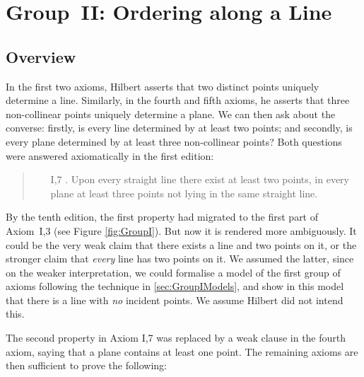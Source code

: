 \chapter{Group~II: Ordering along a Line}\label{chapter:LinearOrder}
\section{Overview}
In the first two axioms, Hilbert asserts that two distinct points uniquely determine a line. Similarly, in the fourth and fifth axioms, he asserts that three non-collinear points uniquely determine a plane. We can then ask about the converse: firstly, is every line determined by at least two points; and secondly, is every plane determined by at least three non-collinear points? Both questions were answered axiomatically in the first edition:

\begin{quote}
  \begin{enumerate}
  \item[I,7]. Upon every straight line there exist at least two points, in every plane at least three points not lying in the same straight line.
  \end{enumerate}
\end{quote}

By the tenth edition, the first property had migrated to the first part of Axiom~I,3 (see Figure \ref{fig:GroupI}). But now it is rendered more ambiguously. It could be the very weak claim that there exists a line and two points on it, or the stronger claim that \emph{every} line has two points on it. We assumed the latter, since on the weaker interpretation, we could formalise a model of the first group of axioms following the technique in \ref{sec:GroupIModels}, and show in this model that there is a line with \emph{no} incident points. We assume Hilbert did not intend this. 

The second property in Axiom I,7 was replaced by a weak clause in the fourth axiom, saying that a plane contains at least one point. The remaining axioms are then sufficient to prove the following:


